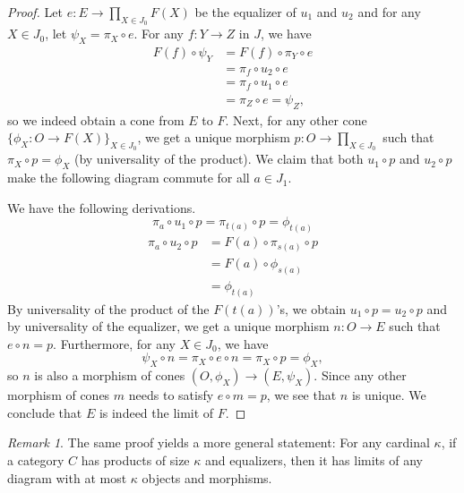 \documentclass{scrartcl}
\theoremstyle{definition}
\theoremstyle{remark}
\newtheorem{rem}[thm]{Remark}
\begin{document}
\begin{proof}
    Let $e:E\rightarrow \prod_{X\in J_0} F(X)$ be the equalizer of $u_1$ and $u_2$ and for any $X \in J_0$, let $\psi_X = \pi_X \circ e$. For any $f: Y \rightarrow Z$ in $J$, we have 
    \begin{align*}
        F(f) \circ \psi_Y &= F(f) \circ \pi_Y \circ e\\ 
        &= \pi_f \circ u_2 \circ e\\ 
        &= \pi_f \circ u_1 \circ e\\
        &= \pi_Z \circ e = \psi_Z,
    \end{align*}
    so we indeed obtain a cone from $E$ to $F$. Next, for any other cone $\{\phi_X: O \rightarrow F(X)\}_{X \in J_0}$, we get a unique morphism $p: O\rightarrow \prod_{X \in J_0}$ such that $\pi_X \circ p = \phi_X$ (by universality of the product). We claim that both $u_1 \circ p$ and $u_2 \circ p$ make the following diagram commute for all $a \in J_1$.
    \begin{figure}[H]
        \centering
    \end{figure}
    We have the following derivations.
    \[
        \pi_a \circ u_1 \circ p = \pi_{t(a)} \circ p = \phi_{t(a)}
    \]
    \begin{align*}
        \pi_a \circ u_2 \circ p &= F(a) \circ \pi_{s(a)} \circ p\\
        &= F(a) \circ \phi_{s(a)}\\
        &= \phi_{t(a)}
    \end{align*}
    By universality of the product of the $F(t(a))$'s, we obtain $u_1 \circ p = u_2 \circ p$ and by universality of the equalizer, we get a unique morphism $n: O\rightarrow E$ such that $e \circ n = p$. Furthermore, for any $X \in J_0$, we have \[\psi_X \circ n = \pi_X \circ e \circ n = \pi_X \circ p = \phi_X,\]
    so $n$ is also a morphism of cones $(O, \phi_X)\rightarrow (E, \psi_X)$. Since any other morphism of cones $m$ needs to satisfy $e \circ m = p$, we see that $n$ is unique. We conclude that $E$ is indeed the limit of $F$.
\end{proof}
\begin{rem}
    The same proof yields a more general statement: For any cardinal $\kappa$, if a category $C$ has products of size $\kappa$ and equalizers, then it has limits of any diagram with at most $\kappa$ objects and morphisms. 
\end{rem}
\end{document}
